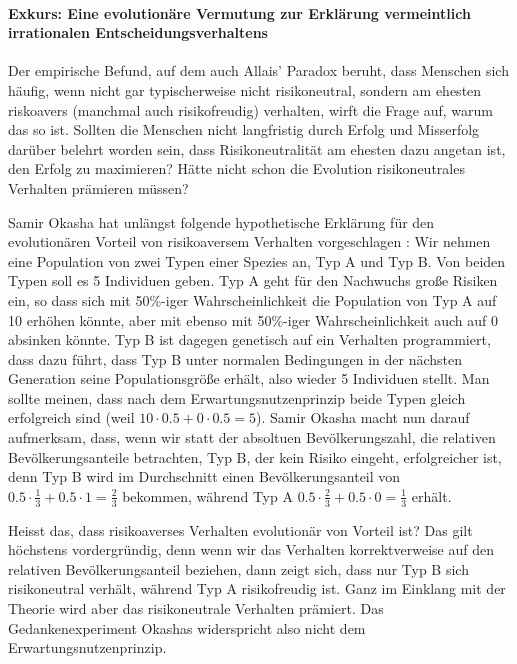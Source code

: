 \paragraph{Exkurs: Eine evolutionäre Vermutung zur Erklärung vermeintlich
irrationalen Entscheidungsverhaltens}

Der empirische Befund, auf dem auch Allais' Paradox beruht, dass Menschen sich
häufig, wenn nicht gar typischerweise nicht risikoneutral, sondern am
ehesten riskoavers (manchmal auch risikofreudig) verhalten, wirft die Frage auf,
warum das so ist. Sollten die Menschen nicht langfristig durch Erfolg und
Misserfolg darüber belehrt worden sein, dass Risikoneutralität am ehesten dazu
angetan ist, den Erfolg zu maximieren? Hätte nicht schon die Evolution
risikoneutrales Verhalten prämieren müssen? 

Samir Okasha hat unlängst folgende hypothetische Erklärung für den
evolutionären Vorteil von risikoaversem Verhalten vorgeschlagen
\cite[]{okasha:2007}: Wir nehmen eine Population von zwei Typen einer Spezies an,
Typ A und Typ B. Von beiden Typen soll es 5 Individuen geben. Typ A geht für den
Nachwuchs große Risiken ein, so dass sich mit 50\%-iger Wahrscheinlichkeit die
Population von Typ A auf 10 erhöhen könnte, aber mit ebenso mit 50\%-iger
Wahrscheinlichkeit auch auf 0 absinken könnte. Typ B ist dagegen genetisch auf
ein Verhalten programmiert, dass dazu führt, dass Typ B unter normalen
Bedingungen in der nächsten Generation seine Populationsgröße erhält, also
wieder 5 Individuen stellt. Man sollte meinen, dass nach dem
Erwartungsnutzenprinzip beide Typen gleich erfolgreich sind (weil $10\cdot 0.5 +
0\cdot 0.5 = 5$). Samir Okasha macht nun darauf aufmerksam, dass, wenn wir
statt der absoltuen Bevölkerungszahl, die relativen Bevölkerungsanteile
betrachten, Typ B, der kein Risiko eingeht, erfolgreicher ist, denn Typ B wird
im Durchschnitt einen Bevölkerungsanteil von $0.5 \cdot \frac{1}{3} + 0.5\cdot 1
= \frac{2}{3}$  bekommen, während Typ A $0.5 \cdot \frac{2}{3} + 0.5 \cdot 0 =
\frac{1}{3}$ erhält. 

Heisst das, dass risikoaverses Verhalten evolutionär von
Vorteil ist? Das gilt höchstens vordergründig, denn wenn wir das Verhalten
korrektverweise auf den relativen Bevölkerungsanteil beziehen, dann zeigt sich,
dass nur Typ B sich risikoneutral verhält, während Typ A risikofreudig ist.
Ganz im Einklang mit der Theorie wird aber das risikoneutrale Verhalten
prämiert. Das Gedankenexperiment Okashas widerspricht also nicht dem
Erwartungsnutzenprinzip. 

